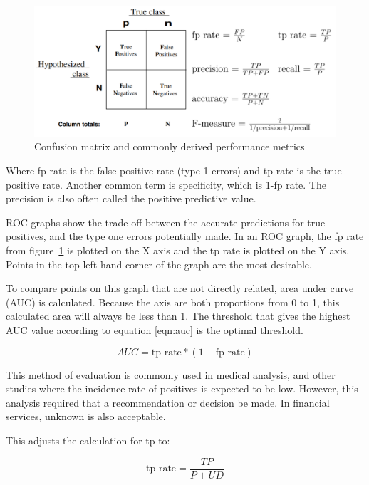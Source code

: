 \begin{figure}[H]
\caption{Confusion matrix and commonly derived performance metrics}
\label{fig:ConfusionMatrix}
\centering
\includegraphics[width=1.0\textwidth]{Figures/ConfusionMatrix.png}
\end{figure}

Where fp rate is the false positive rate (type 1 errors) and tp rate is the true positive rate. Another common term is specificity, which is 1-fp rate. The precision is also often called the positive predictive value.

ROC graphs show the trade-off between the accurate predictions for true positives, and the type one errors potentially made. In an ROC graph, the fp rate from figure~\ref{fig:ConfusionMatrix} is plotted on the X axis and the tp rate is plotted on the Y axis. Points in the top left hand corner of the graph are the most desirable.

To compare points on this graph that are not directly related, area under curve (AUC) is calculated\cite{Guerriere_NN}. Because the axis are both proportions from 0 to 1, this calculated area will always be less than 1. The threshold that gives the highest AUC value according to equation \ref{eqn:auc} is the optimal threshold.

\begin{equation}\label{eqn:auc}
    AUC = \text{tp rate} * (1-\text{fp rate})
\end{equation}

This method of evaluation is commonly used in medical analysis, and other studies where the incidence rate of positives is expected to be low. However, this analysis required that a recommendation or decision be made. In financial services, unknown is also acceptable\cite{efficient_markets}.

This adjusts the calculation for tp to:

\begin{equation}\label{eqn:tp_adj}
    \text{tp rate} = \frac{TP}{P+UD}
\end{equation}

